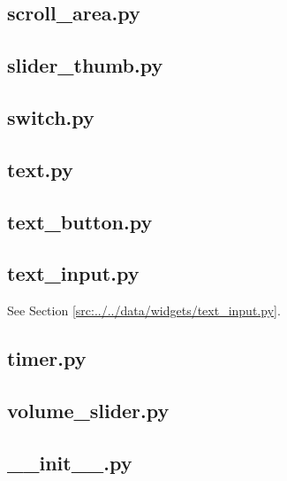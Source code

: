 \documentclass[../main/main.tex]{subfiles}
\begin{document}
\subsection{scroll\_area.py}

\label{src:data/widgets/scroll_area.py}

\subsection{slider\_thumb.py}

\label{src:data/widgets/slider_thumb.py}

\subsection{switch.py}

\label{src:data/widgets/switch.py}

\subsection{text.py}

\label{src:data/widgets/text.py}

\subsection{text\_button.py}

\label{src:data/widgets/text_button.py}

\subsection{text\_input.py}
See Section \ref{src:../../data/widgets/text_input.py}.

\subsection{timer.py}

\label{src:data/widgets/timer.py}

\subsection{volume\_slider.py}

\label{src:data/widgets/volume_slider.py}

\subsection{\_\_init\_\_.py}

\label{src:data/widgets/__init__.py}
\end{document}
